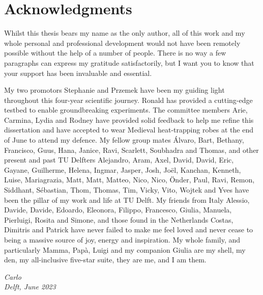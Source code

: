 \chapter*{Acknowledgments}

Whilst this thesis bears my name as the only author, all of this work and my whole personal and
professional development would not have been remotely possible without the help of a number of
people. There is no way a few paragraphs can express my gratitude satisfactorily, but I want you to
know that your support has been invaluable and essential.

My two promotors Stephanie and Przemek have been my guiding light throughout this four-year
scientific journey. Ronald has provided a cutting-edge testbed to enable groundbreaking experiments.
The committee members Arie, Carmina, Lydia and Rodney have provided solid feedback to help me refine
this dissertation and have accepted to wear Medieval heat-trapping robes at the end of June to
attend my defence. My fellow group mates Álvaro, Bart, Bethany, Francisco, Guus, Hana, Janice, Ravi,
Scarlett, Soubhadra and Thomas, and other present and past TU Delfters Alejandro, Aram, Axel, David,
David, Eric, Gayane, Guilherme, Helena, Ingmar, Jasper, Josh, Joël, Kanchan, Kenneth, Luise,
Mariagrazia, Matt, Matt, Matteo, Nico, Nico, Önder, Paul, Ravi, Remon, Siddhant, Sébastian, Thom,
Thomas, Tim, Vicky, Vito, Wojtek and Yves have been the pillar of my work and life at TU Delft. My
friends from Italy Alessio, Davide, Davide, Edoardo, Eleonora, Filippo, Francesco, Giulia, Manuela,
Pierluigi, Rosita and Simone, and those found in the Netherlands Costas, Dimitris and Patrick have
never failed to make me feel loved and never cease to being a massive source of joy, energy and
inspiration. My whole family, and particularly Mamma, Papà, Luigi and my companion Giulia are my
shell, my den, my all-inclusive five-star suite, they are me, and I am them.

\begin{flushright}
{\itshape
Carlo \\
Delft, June 2023
}
\end{flushright}
